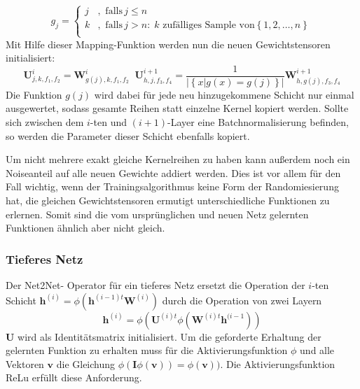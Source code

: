 \begin{equation}
 g_{j} =  
 \begin{cases}
 j & , \text{ falls} \, j \leq n \\
 k & , \text{ falls} \, j>n : \;  k \text{ zufälliges Sample von} \left\{ 1,2,\ldots, n \right\} \\ 
 \end{cases} 
 \end{equation}
 Mit Hilfe dieser Mapping-Funktion werden nun die neuen Gewichtstensoren initialisiert:
 \begin{equation}
 \mathbf{U}^i_{j,k,f_1,f_2} = \mathbf{W}^i_{g(j),k,f_1,f_2} \; \; \mathbf{U}^{i+1}_{h,j,f_3,f_4}= \frac{1}{|\left\{ x | g(x)=g(j)\right\}|}\mathbf{W}^{i+1}_{h,g(j),f_3,f_4}
 \end{equation}
Die Funktion $g(j)$ wird dabei für jede neu hinzugekommene Schicht nur einmal ausgewertet, sodass gesamte Reihen statt einzelne Kernel kopiert werden. Sollte sich zwischen dem $i$-ten und $(i+1)$-Layer eine Batchnormalisierung befinden, so werden die Parameter dieser Schicht ebenfalls kopiert.

Um nicht mehrere exakt gleiche Kernelreihen zu haben kann außerdem noch ein Noiseanteil auf alle neuen Gewichte addiert werden. Dies ist vor allem für den Fall wichtig, wenn der Trainingsalgorithmus keine Form der Randomiesierung hat, die gleichen Gewichtstensoren ermutigt unterschiedliche Funktionen zu erlernen. Somit sind die vom ursprünglichen und neuen Netz gelernten Funktionen ähnlich aber nicht gleich.

\subsubsection{Tieferes Netz}

Der Net2Net- Operator für ein tieferes Netz ersetzt die Operation der $i$-ten Schicht $\mathbf{h}^{(i)} = \phi\left(\mathbf{h}^{(i-1)t} \mathbf{W}^{(i)}\right)$ durch die Operation von zwei Layern  
\begin{equation}
\mathbf{h}^{(i)} = \phi( \mathbf{U}^{(i)t} \phi(\mathbf{W}^{(i)t}  \mathbf{h}^{(i-1}) )
\end{equation}
$\mathbf{U}$ wird als Identitätsmatrix initialisiert. Um die geforderte Erhaltung der gelernten Funktion zu erhalten muss für die Aktivierungsfunktion $\phi$ und alle Vektoren $\mathbf{v}$ die Gleichung $\phi(\mathbf{I} \phi(\mathbf{v}))=\phi(\mathbf{v}))$. Die Aktivierungsfunktion ReLu erfüllt diese Anforderung.

